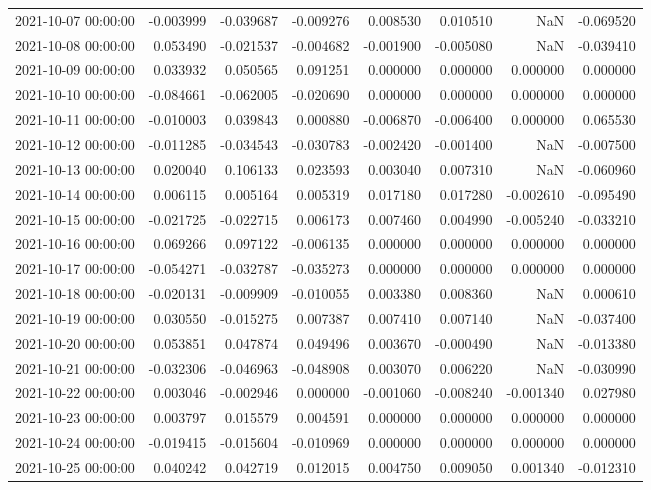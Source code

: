 \begin{tabular}{lrrrrrrr}
2021-10-07 00:00:00 & -0.003999 & -0.039687 & -0.009276 & 0.008530 & 0.010510 & NaN & -0.069520 \\
2021-10-08 00:00:00 & 0.053490 & -0.021537 & -0.004682 & -0.001900 & -0.005080 & NaN & -0.039410 \\
2021-10-09 00:00:00 & 0.033932 & 0.050565 & 0.091251 & 0.000000 & 0.000000 & 0.000000 & 0.000000 \\
2021-10-10 00:00:00 & -0.084661 & -0.062005 & -0.020690 & 0.000000 & 0.000000 & 0.000000 & 0.000000 \\
2021-10-11 00:00:00 & -0.010003 & 0.039843 & 0.000880 & -0.006870 & -0.006400 & 0.000000 & 0.065530 \\
2021-10-12 00:00:00 & -0.011285 & -0.034543 & -0.030783 & -0.002420 & -0.001400 & NaN & -0.007500 \\
2021-10-13 00:00:00 & 0.020040 & 0.106133 & 0.023593 & 0.003040 & 0.007310 & NaN & -0.060960 \\
2021-10-14 00:00:00 & 0.006115 & 0.005164 & 0.005319 & 0.017180 & 0.017280 & -0.002610 & -0.095490 \\
2021-10-15 00:00:00 & -0.021725 & -0.022715 & 0.006173 & 0.007460 & 0.004990 & -0.005240 & -0.033210 \\
2021-10-16 00:00:00 & 0.069266 & 0.097122 & -0.006135 & 0.000000 & 0.000000 & 0.000000 & 0.000000 \\
2021-10-17 00:00:00 & -0.054271 & -0.032787 & -0.035273 & 0.000000 & 0.000000 & 0.000000 & 0.000000 \\
2021-10-18 00:00:00 & -0.020131 & -0.009909 & -0.010055 & 0.003380 & 0.008360 & NaN & 0.000610 \\
2021-10-19 00:00:00 & 0.030550 & -0.015275 & 0.007387 & 0.007410 & 0.007140 & NaN & -0.037400 \\
2021-10-20 00:00:00 & 0.053851 & 0.047874 & 0.049496 & 0.003670 & -0.000490 & NaN & -0.013380 \\
2021-10-21 00:00:00 & -0.032306 & -0.046963 & -0.048908 & 0.003070 & 0.006220 & NaN & -0.030990 \\
2021-10-22 00:00:00 & 0.003046 & -0.002946 & 0.000000 & -0.001060 & -0.008240 & -0.001340 & 0.027980 \\
2021-10-23 00:00:00 & 0.003797 & 0.015579 & 0.004591 & 0.000000 & 0.000000 & 0.000000 & 0.000000 \\
2021-10-24 00:00:00 & -0.019415 & -0.015604 & -0.010969 & 0.000000 & 0.000000 & 0.000000 & 0.000000 \\
2021-10-25 00:00:00 & 0.040242 & 0.042719 & 0.012015 & 0.004750 & 0.009050 & 0.001340 & -0.012310 \\

\end{tabular}
